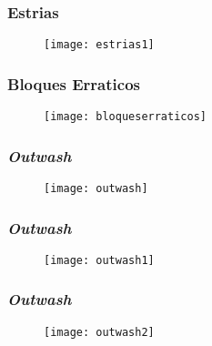 \documentclass{beamer}
\begin{document}
\begin{frame}
\frametitle{Estrias}
\begin{figure}
\begin{center}
\texttt{[image: estrias1]}
\end{center}
\end{figure}
\end{frame}
\begin{frame}
\frametitle{Bloques Erraticos}
\begin{figure}
\begin{center}
\texttt{[image: bloqueserraticos]}
\end{center}
\end{figure}
\end{frame}
\begin{frame}
\frametitle{\emph{Outwash}}
\begin{figure}
\begin{center}
\texttt{[image: outwash]}
\end{center}
\end{figure}
\end{frame}
\begin{frame}
\frametitle{\emph{Outwash}}
\begin{figure}
\begin{center}
\texttt{[image: outwash1]}
\end{center}
\end{figure}
\end{frame}
\begin{frame}
\frametitle{\emph{Outwash}}
\begin{figure}
\begin{center}
\texttt{[image: outwash2]}
\end{center}
\end{figure}
\end{frame}
\end{document}
